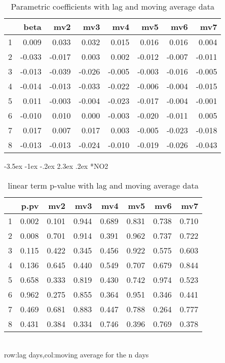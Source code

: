 \documentclass[a4paper, 12pt]{article}
\makeatletter
\def\large{\fontsize{14}{20}\selectfont}
\renewcommand\subsection{\@startsection {subsection}{1}{\z@}%
                                   {-3.5ex \@plus -1ex \@minus -.2ex}%
                                   {2.3ex \@plus.2ex}%
                                   {\centering\normalfont\large\bfseries}}
\makeatother
\begin{document}
\begin{table}[h]
\centering
\caption{Parametric coefficients with lag and moving average data}
\begin{tabular}{rrrrrrrr}
  \hline
 & beta & mv2 & mv3 & mv4 & mv5 & mv6 & mv7 \\
  \hline
1 & 0.009 & 0.033 & 0.032 & 0.015 & 0.016 & 0.016 & 0.004 \\
  2 & -0.033 & -0.017 & 0.003 & 0.002 & -0.012 & -0.007 & -0.011 \\
  3 & -0.013 & -0.039 & -0.026 & -0.005 & -0.003 & -0.016 & -0.005 \\
  4 & -0.014 & -0.013 & -0.033 & -0.022 & -0.006 & -0.004 & -0.015 \\
  5 & 0.011 & -0.003 & -0.004 & -0.023 & -0.017 & -0.004 & -0.001 \\
  6 & -0.010 & 0.010 & 0.000 & -0.003 & -0.020 & -0.011 & 0.005 \\
  7 & 0.017 & 0.007 & 0.017 & 0.003 & -0.005 & -0.023 & -0.018 \\
  8 & -0.013 & -0.013 & -0.024 & -0.010 & -0.019 & -0.026 & -0.043 \\
   \hline
\end{tabular}
\end{table}
\clearpage
\subsection*{NO2}
\begin{table}[h]
\centering
\caption{linear term p-value with lag and moving average data}
\begin{tabular}{rrrrrrrr}
  \hline
 & p.pv & mv2 & mv3 & mv4 & mv5 & mv6 & mv7 \\
  \hline
1 & 0.002 & 0.101 & 0.944 & 0.689 & 0.831 & 0.738 & 0.710 \\
  2 & 0.008 & 0.701 & 0.914 & 0.391 & 0.962 & 0.737 & 0.722 \\
  3 & 0.115 & 0.422 & 0.345 & 0.456 & 0.922 & 0.575 & 0.603 \\
  4 & 0.136 & 0.645 & 0.440 & 0.549 & 0.707 & 0.679 & 0.844 \\
  5 & 0.658 & 0.333 & 0.819 & 0.430 & 0.742 & 0.974 & 0.523 \\
  6 & 0.962 & 0.275 & 0.855 & 0.364 & 0.951 & 0.346 & 0.441 \\
  7 & 0.469 & 0.681 & 0.883 & 0.447 & 0.788 & 0.264 & 0.777 \\
  8 & 0.431 & 0.384 & 0.334 & 0.746 & 0.396 & 0.769 & 0.378 \\
   \hline
\end{tabular}
\\row:lag days,col:moving average for the n days
\end{table}
\end{document}
